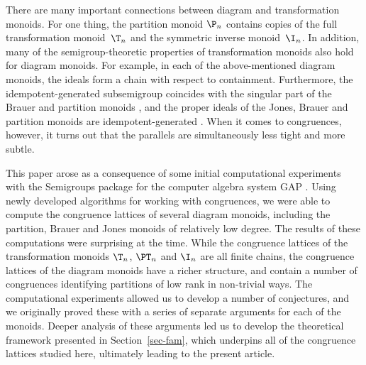 There are many important connections between diagram and transformation
monoids.  For one thing, the partition monoid $\P_n$ contains copies of the
full transformation monoid~$\T_n$ and the symmetric inverse monoid~$\I_n$.  In
addition, many of the semigroup-theoretic properties of transformation monoids
also hold for diagram monoids.  For example, in each of the above-mentioned
diagram monoids, the ideals form a chain with respect to containment.
Furthermore, the idempotent-generated subsemigroup coincides with the singular
part of the Brauer and partition monoids \cite{JEpnsn,MM2007}, and the proper
ideals of the Jones, Brauer and partition monoids are idempotent-generated
\cite{EG2017}.
%
When it comes to congruences, however, it turns out that the parallels are
simultaneously less tight and more subtle.  

This paper arose as a consequence
of some initial computational experiments with the Semigroups package
for the computer algebra system GAP \cite{GAP}.  Using newly developed
algorithms for working with congruences, we were able to compute the congruence
lattices of several diagram monoids, including the partition, Brauer and Jones
monoids of relatively low degree.  The results of these computations were
surprising at the time.  While the congruence lattices of the transformation
monoids $\T_n$, $\PT_n$ and $\I_n$ are all finite chains, the congruence
lattices of the diagram monoids have a richer structure, and contain a number
of congruences identifying partitions of low {rank} in non-trivial ways.
%
The computational experiments allowed us to develop a number of conjectures, and we originally proved these with a series of separate arguments for each of the monoids.  Deeper analysis of these arguments led us to develop the theoretical framework presented in Section~\ref{sec-fam}, which underpins all of the congruence lattices studied here, ultimately leading to the present article.

